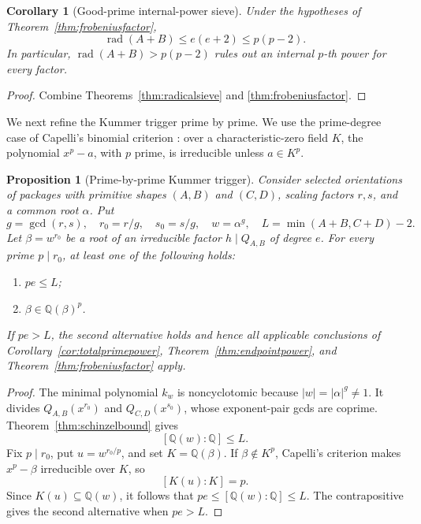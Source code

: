 \documentclass[11pt]{article}
\newtheorem{proposition}[theorem]{Proposition}
\newtheorem{corollary}[theorem]{Corollary}
\theoremstyle{definition}
\newcommand{\Q}{\mathbb Q}
\begin{document}
\begin{corollary}[Good-prime internal-power sieve]
\label{cor:goodpower}
Under the hypotheses of Theorem~\ref{thm:frobeniusfactor},
\[
 \operatorname{rad}(A+B)\leq e(e+2)\leq p(p-2).
\]
In particular, \(\operatorname{rad}(A+B)>p(p-2)\) rules out an internal
\(p\)-th power for every factor.
\end{corollary}

\begin{proof}
Combine Theorems~\ref{thm:radicalsieve} and
\ref{thm:frobeniusfactor}.
\end{proof}

We next refine the Kummer trigger prime by prime.  We use the prime-degree
case of Capelli's binomial criterion
\cite[Chapter~VI, Section~9]{LangAlgebra}: over a characteristic-zero field
\(K\), the polynomial \(x^p-a\), with \(p\) prime, is irreducible unless
\(a\in K^p\).

\begin{proposition}[Prime-by-prime Kummer trigger]
\label{prop:largetrigger}
Consider selected orientations of packages with primitive shapes \((A,B)\)
and \((C,D)\), scaling factors \(r,s\), and a common root \(\alpha\).  Put
\[
 g=\gcd(r,s),\quad r_0=r/g,\quad s_0=s/g,
 \quad w=\alpha^g,
 \quad L=\min(A+B,C+D)-2.
\]
Let \(\beta=w^{r_0}\) be a root of an irreducible factor
\(h\mid Q_{A,B}\) of degree \(e\).  For every prime \(p\mid r_0\), at
least one of the following holds:
\begin{enumerate}[label=(\roman*)]
\item \(pe\leq L\);
\item \(\beta\in\Q(\beta)^p\).
\end{enumerate}
If \(pe>L\), the second alternative holds and hence all applicable
conclusions of Corollary~\ref{cor:totalprimepower},
Theorem~\ref{thm:endpointpower}, and
Theorem~\ref{thm:frobeniusfactor} apply.
\end{proposition}

\begin{proof}
The minimal polynomial \(k_w\) is noncyclotomic because
\(|w|=|\alpha|^g\neq1\).  It divides
\(Q_{A,B}(x^{r_0})\) and \(Q_{C,D}(x^{s_0})\), whose exponent-pair gcds
are coprime.  Theorem~\ref{thm:schinzelbound} gives
\[
 [\Q(w):\Q]\leq L.
\]
Fix \(p\mid r_0\), put \(u=w^{r_0/p}\), and set
\(K=\Q(\beta)\).  If \(\beta\notin K^p\), Capelli's criterion makes
\(x^p-\beta\) irreducible over \(K\), so
\[
 [K(u):K]=p.
\]
Since \(K(u)\subseteq\Q(w)\), it follows that
\(pe\leq[\Q(w):\Q]\leq L\).  The contrapositive gives the second
alternative when \(pe>L\).
\end{proof}
\end{document}

